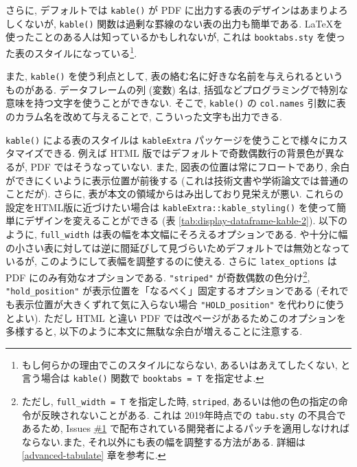 \documentclass[
  xelatex,ja=standard,jafont=noto]{bxjsbook}
\theoremstyle{definition}
\theoremstyle{definition}
\theoremstyle{definition}
\theoremstyle{definition}
\theoremstyle{remark}
\begin{document}
さらに, デフォルトでは \texttt{kable()} が PDF
に出力する表のデザインはあまりよろしくないが, \texttt{kable()}
関数は過剰な罫線のない表の出力も簡単である.
\LaTeX を使ったことのある人は知っているかもしれないが, これは
\texttt{booktabs.sty} を使った表のスタイルになっている\footnote{もし何らかの理由でこのスタイルにならない,
  あるいはあえてしたくない, と言う場合は \texttt{kable()} 関数で
  \texttt{booktabs\ =\ T} を指定せよ.}.

また, \texttt{kable()} を使う利点として,
表の絡む名に好きな名前を与えられるというものがある. データフレームの列
(変数) 名は,
括弧などプログラミングで特別な意味を持つ文字を使うことができない.
そこで, \texttt{kable()} の \texttt{col.names}
引数に表のカラム名を改めて与えることで, こういった文字も出力できる.

\texttt{kable()} による表のスタイルは \texttt{kableExtra}
パッケージを使うことで様々にカスタマイズできる. 例えば HTML
版ではデフォルトで奇数偶数行の背景色が異なるが, PDF
ではそうなっていない. また, 図表の位置は常にフロートであり,
余白ができにくいように表示位置が前後する
(これは技術文書や学術論文では普通のことだが). さらに,
表が本文の領域からはみ出しており見栄えが悪い.
これらの設定をHTML版に近づけたい場合は
\texttt{kableExtra::kable\_styling()}
を使って簡単にデザインを変えることができる (表
\ref{tab:display-dataframe-kable-2}). 以下のように, \texttt{full\_width}
は表の幅を本文幅にそろえるオプションである.
や十分に幅の小さい表に対しては逆に間延びして見づらいためデフォルトでは無効となっているが,
このようにして表幅を調整するのに使える. さらに \texttt{latex\_options}
は PDF にのみ有効なオプションである. \texttt{"striped"}
が奇数偶数の色分け\footnote{ただし, \texttt{full\_width\ =\ T}
  を指定した時, \texttt{striped},
  あるいは他の色の指定の命令が反映されないことがある. これは
  2019年時点での \texttt{tabu.sty} の不具合であるため, Issues
  \href{https://github.com/tabu-issues-for-future-maintainer/tabu/issues/1\#issuecomment-464369706}{\#1}
  で配布されている開発者によるパッチを適用しなければならない.また,
  それ以外にも表の幅を調整する方法がある. 詳細は \ref{advanced-tabulate}
  章を参考に.}, \texttt{"hold\_position"}
が表示位置を「なるべく」固定するオプションである
(それでも表示位置が大きくずれて気に入らない場合
\texttt{"HOLD\_position"} を代わりに使うとよい). ただし HTML と違い PDF
では改ページがあるためこのオプションを多様すると,
以下のように本文に無駄な余白が増えることに注意する.
\end{document}
